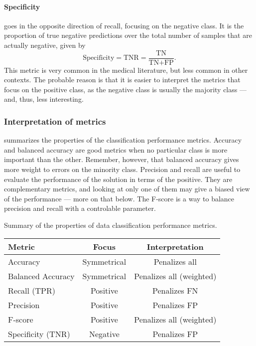 \paragraph{Specificity} goes in the opposite direction of recall, focusing on the negative
class.  It is the proportion of true negative predictions over the total
number of samples that are actually negative, given by
\begin{equation*}
  \text{Specificity} = \text{TNR} = \frac{\text{TN}}{\text{TN} + \text{FP}}\text{.}
\end{equation*}
This metric is very common in the medical literature, but less common in other contexts.
The probable reason is that it is easier to interpret the metrics that focus on the
positive class, as the negative class is usually the majority class --- and, thus, less
interesting.

\subsubsection{Interpretation of metrics}

 summarizes the properties of the classification
performance metrics.  Accuracy and balanced accuracy are good metrics when no particular
class is more important than the other.  Remember, however, that balanced accuracy gives
more weight to errors on the minority class.  Precision and recall are useful to evaluate
the performance of the solution in terms of the positive.  They are complementary metrics,
and looking at only one of them may give a biased view of the performance --- more on that
below.  The F-score is a way to balance precision and recall with a controlable parameter.

\begin{tablebox}[label=tab:classification-metrics]{Summary of the properties of
  data classification performance metrics.}
  \centering
  \begin{tabular}{l c c}
    \toprule
    \textbf{Metric} & \textbf{Focus} & \textbf{Interpretation} \\
    \midrule
    Accuracy           & Symmetrical & Penalizes all \\
    Balanced Accuracy  & Symmetrical & Penalizes all (weighted) \\
    Recall (TPR)       & Positive & Penalizes FN \\
    Precision          & Positive & Penalizes FP \\
    F-score            & Positive & Penalizes all (weighted) \\
    Specificity (TNR)  & Negative & Penalizes FP \\
    \bottomrule
  \end{tabular}
\end{tablebox}

